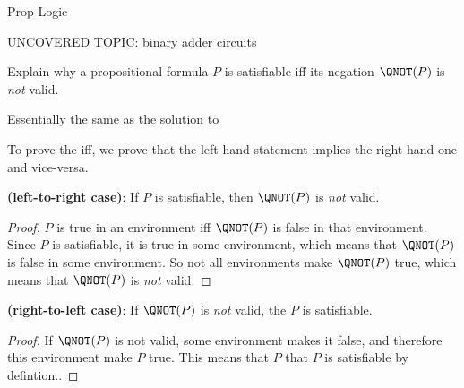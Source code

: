 \documentclass[quiz]{mcs}
\begin{document}


\examspace

\begin{center}
{\large Prop Logic}
\end{center}

UNCOVERED TOPIC: binary adder circuits

\begin{problem}[points = 6, title= \textbf{Satisfiability}]

\begin{pcomments}
\end{pcomments}

Explain why a propositional formula $P$ is satisfiable iff its
negation $\QNOT(P)$ is \emph{not} valid.

\begin{solution}
Essentially the same as the solution to~

To prove the iff, we prove that the left hand statement implies the
right hand one and vice-versa.

\textbf{(left-to-right case)}: If $P$ is satisfiable, then $\QNOT(P)$ is \emph{not}
valid.

\begin{proof}
$P$ is true in an environment iff $\QNOT(P)$ is false in that
environment.  Since $P$ is satisfiable, it is true in some environment, which
means that $\QNOT(P)$ is false in some environment.  So not all environments make
$\QNOT(P)$ true, which means that $\QNOT(P)$ is \emph{not} valid.
\end{proof}

\textbf{(right-to-left case)}: If $\QNOT(P)$ is \emph{not}
valid, the $P$ is satisfiable.

\begin{proof}
If $\QNOT(P)$ is not valid, some environment makes it false, and
therefore this environment make $P$ true.  This means that $P$ that
$P$ is satisfiable by defintion..
\end{proof}

\end{solution}

\end{problem}
\end{document}
